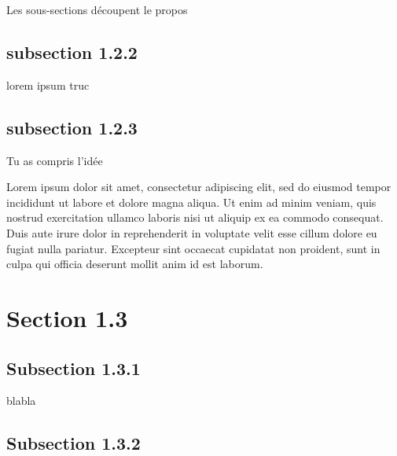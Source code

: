 Les sous-sections découpent le propos 
    
\subsection{subsection 1.2.2}

lorem ipsum truc

\subsection{subsection 1.2.3}

Tu as compris l'idée


\medskip
Lorem ipsum dolor sit amet, consectetur adipiscing elit, sed do eiusmod tempor incididunt ut labore et dolore magna aliqua. Ut enim ad minim veniam, quis nostrud exercitation ullamco laboris nisi ut aliquip ex ea commodo consequat. Duis aute irure dolor in reprehenderit in voluptate velit esse cillum dolore eu fugiat nulla pariatur. Excepteur sint occaecat cupidatat non proident, sunt in culpa qui officia deserunt mollit anim id est laborum.
\section{Section 1.3}

\subsection{Subsection 1.3.1}
blabla
\subsection{Subsection 1.3.2}

